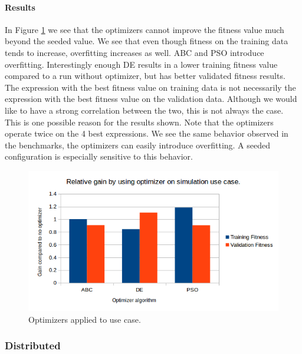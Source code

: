 \paragraph{Results}
In Figure \ref{fig:usecaseoptimizers} we see that the optimizers cannot improve the fitness value much beyond the seeded value. We see that even though fitness on the training data tends to increase, overfitting increases as well. ABC and PSO introduce overfitting. Interestingly enough DE results in a lower training fitness value compared to a run without optimizer, but has better validated fitness results. The expression with the best fitness value on training data is not necessarily the expression with the best fitness value on the validation data. Although we would like to have a strong correlation between the two, this is not always the case. This is one possible reason for the results shown. Note that the optimizers operate twice on the 4 best expressions. We see the same behavior observed in the benchmarks, the optimizers can easily introduce overfitting. A seeded configuration is especially sensitive to this behavior.
\begin{figure}
    \centering
    \includegraphics[width=\textwidth,height=\textheight,keepaspectratio]{figures/usecaseoptimizers.png}
    \caption{Optimizers applied to use case.}
    \label{fig:usecaseoptimizers}
\end{figure}

\subsubsection{Distributed}
